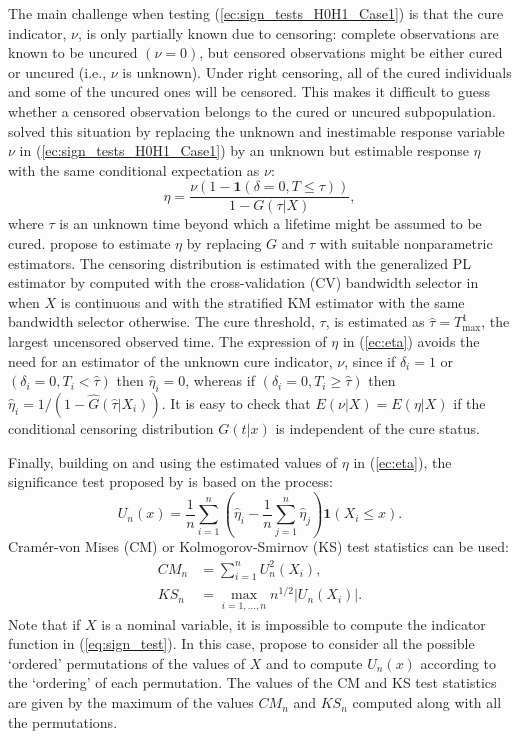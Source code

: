 The main challenge when testing (\ref{ec:sign_tests_H0H1_Case1}) is that the cure indicator, $\nu$, is only partially known due to censoring: complete observations are known to be uncured $\left (\nu=0 \right)$, but censored observations might be either cured or uncured (i.e., $\nu$ is unknown). Under right censoring, all of the cured individuals and some of the uncured ones will be censored. This makes it difficult to guess whether a censored observation belongs to the cured or uncured subpopulation. \cite{Lopez3} solved this situation by replacing the unknown and inestimable response variable $\nu$ in (\ref{ec:sign_tests_H0H1_Case1}) by an unknown but estimable response $\eta$ with the same conditional expectation as $\nu$:
\begin{equation}\label{ec:eta}
 \eta=\frac{\nu \left(1-\mathbf{1}(\delta=0,T\leq \tau )\right)}{1- G\left(\tau |X\right)},
\end{equation}
where $\tau$ is an unknown time beyond which a lifetime might be assumed to be cured. \cite{Lopez3} propose to estimate $\eta$ by replacing $G$ and $\tau$ with suitable nonparametric estimators. The censoring distribution is estimated with the generalized PL estimator by \cite{Beran} computed with the cross-validation (CV) bandwidth selector in \cite{Geerdens} when $X$ is continuous and with the stratified KM estimator with the same bandwidth selector otherwise. The cure threshold, $\tau$, is estimated as $\hat\tau=T^1_{\max}$, the largest uncensored observed time. The expression of $\eta$ in (\ref{ec:eta}) avoids the need for an estimator of the unknown cure indicator, $\nu$, since if $\delta_i=1$ or $\left(\delta_i=0, T_i < \hat\tau \right)$ then $\hat\eta_i=0$, whereas if $\left(\delta_i=0, T_i \geq \hat\tau \right)$ then $\hat\eta_i=1/\left(1-\hat G(\hat\tau | X_i) \right)$. It is easy to check that $E\left(\nu|X \right) = E\left(\eta|X \right)$ if the conditional censoring distribution $G\left(t|x \right)$ is independent of the cure status.

Finally, building on \cite{Delgado} and using the estimated values of $\eta$ in (\ref{ec:eta}), the significance test proposed by \cite{Lopez3} is based on the process:
\begin{equation} \label{eq:sign_test}
U_{n}(x)=\frac{1}{n}\sum_{i=1}^{n} \left (\hat{\eta}_{i}- \frac{1}{n}\sum_{j=1}^{n}\hat{\eta}_{j} \right)\mathbf{1}\left( X_{i}\leq x\right ).
\end{equation}
Cram\'er-von Mises (CM) or Kolmogorov-Smirnov (KS) test statistics can be used:
\begin{align}
CM_n &= \sum_{i=1}^n U_n^2(X_i), \nonumber \\
KS_n &= \max_{i=1,\ldots,n} n^{1/2}| U_n(X_i)|.
\end{align}
Note that if $X$ is a nominal variable, it is impossible to compute the indicator function in (\ref{eq:sign_test}). In this case, \cite{Lopez3} propose to consider all the possible `ordered' permutations of the values of $X$ and to compute $U_n(x)$ according to the `ordering' of each permutation. The values of the CM and KS test statistics are given by the maximum of the values $CM_n$ and $KS_n$ computed along with all the permutations.

